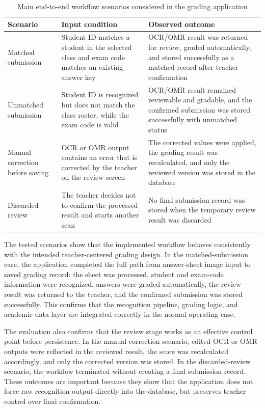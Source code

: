 \documentclass[../Main.tex]{subfiles}
\begin{document}
\begin{table}[H]
\centering
\caption{Main end-to-end workflow scenarios considered in the grading application}
\label{table:end_to_end_workflow_scenarios}
\begin{tabular}{p{2.8cm}p{5.0cm}p{6.0cm}}
\hline
\textbf{Scenario} & \textbf{Input condition} & \textbf{Observed outcome} \\ \hline
Matched submission & Student ID matches a student in the selected class and exam code matches an existing answer key & OCR/OMR result was returned for review, graded automatically, and stored successfully as a matched record after teacher confirmation \\ \hline
Unmatched submission & Student ID is recognized but does not match the class roster, while the exam code is valid & OCR/OMR result remained reviewable and gradable, and the confirmed submission was stored successfully with unmatched status \\ \hline
Manual correction before saving & OCR or OMR output contains an error that is corrected by the teacher on the review screen & The corrected values were applied, the grading result was recalculated, and only the reviewed version was stored in the database \\ \hline
Discarded review & The teacher decides not to confirm the processed result and starts another scan & No final submission record was stored when the temporary review result was discarded \\ \hline
\end{tabular}
\end{table}

The tested scenarios show that the implemented workflow behaves consistently
with the intended teacher-centered grading design. In the matched-submission
case, the application completed the full path from answer-sheet image input to
saved grading record: the sheet was processed, student and exam-code
information were recognized, answers were graded automatically, the review
result was returned to the teacher, and the confirmed submission was stored
successfully. This confirms that the recognition pipeline, grading logic, and
academic data layer are integrated correctly in the normal operating case.

The evaluation also confirms that the review stage works as an effective
control point before persistence. In the manual-correction scenario, edited OCR
or OMR outputs were reflected in the reviewed result, the score was
recalculated accordingly, and only the corrected version was stored. In the
discarded-review scenario, the workflow terminated without creating a final
submission record. These outcomes are important because they show that the
application does not force raw recognition output directly into the database,
but preserves teacher control over final confirmation.
\end{document}
